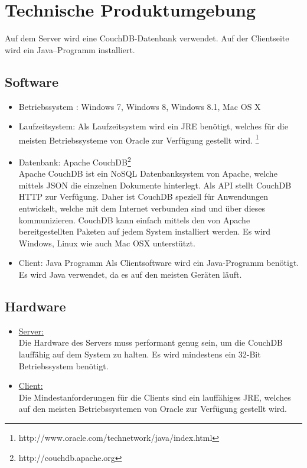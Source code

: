 \documentclass[a4paper,listof=leveldown,listof=numbered]{scrreprt}
\begin{document}
\chapter{Technische Produktumgebung}
	Auf dem Server wird eine CouchDB-Datenbank verwendet. Auf der Clientseite wird ein Java–Programm installiert.
	
	\section{Software}
	\begin{itemize}
		\item Betriebssystem : Windows 7, Windows 8, Windows 8.1, Mac OS X
		\item Laufzeitsystem: Als Laufzeitsystem wird ein \ac{JRE} benötigt, welches für die meisten Betriebssysteme von Oracle zur Verfügung gestellt wird. \footnote{http://www.oracle.com/technetwork/java/index.html}
		\item Datenbank: Apache CouchDB\footnote{http://couchdb.apache.org}\\
			Apache CouchDB ist ein NoSQL Datenbanksystem von Apache, welche mittels \ac{JSON} die einzelnen Dokumente hinterlegt. Als API stellt CouchDB \ac{HTTP} zur Verfügung. Daher ist CouchDB speziell für Anwendungen entwickelt, welche mit dem Internet verbunden sind und über dieses kommunizieren. CouchDB kann einfach mittels den von Apache bereitgestellten Paketen auf jedem System installiert werden. Es wird Windows, Linux wie auch Mac OSX unterstützt. 
		\item Client: Java Programm
			Als Clientsoftware wird ein Java-Programm benötigt. Es wird Java verwendet, da es auf den meisten Geräten läuft.
	\end{itemize}

	\section{Hardware}
	\begin{itemize}
		\item \underline{Server:} \\
			Die Hardware des Servers muss performant genug sein, um die  	CouchDB lauffähig auf dem System zu halten. Es wird mindestens ein 32-Bit Betriebssystem benötigt.
		
		\item \underline{Client:}\\
			Die Mindestanforderungen für die Clients sind ein lauffähiges \ac{JRE}, welches auf den meisten Betriebssystemen von Oracle zur Verfügung gestellt wird.
	\end{itemize}
\end{document}
